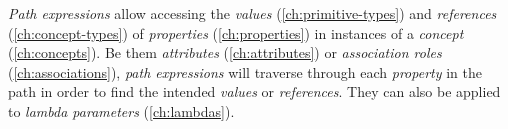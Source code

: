 \emph{Path expressions} allow accessing
the \emph{values} (\ref{ch:primitive-types})
and \emph{references} (\ref{ch:concept-types})
of \emph{properties} (\ref{ch:properties})
in instances of a \emph{concept} (\ref{ch:concepts}).
Be them
\emph{attributes} (\ref{ch:attributes})
or \emph{association roles} (\ref{ch:associations}),
\emph{path expressions} will traverse through each \emph{property}
in the path in order to find the intended \emph{values} or \emph{references}.
They can also be applied to \emph{lambda parameters} (\ref{ch:lambdas}).
